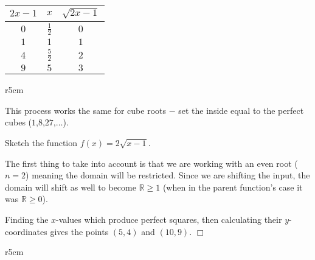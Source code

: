 \documentclass[lang=en,11pt]{elegantbook}
\begin{document}
\begin{table}[!h]
    \centering
    \begin{tabular}{|c|c|c|}
       \toprule
        $2x-1$ & $x$ & $\sqrt{2x-1}$ \\
        \midrule
        $0$ & $\frac{1}{2}$ & $0$ \\
        $1$ & $1$ & $1$ \\
        $4$ & $\frac{5}{2}$ & $2$ \\
        $9$ & $5$ & $3$ \\
        \bottomrule
    \end{tabular}
\end{table}

\begin{wrapfigure}{r}{5cm}
\end{wrapfigure}
This process works the same for cube roots $-$ set the inside equal to the perfect cubes ($1$,$8$,$27$,$\ldots$).

\begin{example}
Sketch the function $f(x)=2\sqrt{x-1}$.
\end{example}
\begin{solution}
The first thing to take into account is that we are working with an even root ($n=2$) meaning the domain will be restricted. Since we are shifting the input, the domain will shift as well to become $\mathbb{R}\geq 1$ (when in the parent function’s case it was $\mathbb{R}\geq 0$). 

Finding the $x$-values which produce perfect squares, then calculating their $y$-coordinates gives the points $(5,4)$ and $(10,9)$. $\Box$
\end{solution}

\begin{wrapfigure}{r}{5cm}
\end{wrapfigure}
\end{document}
